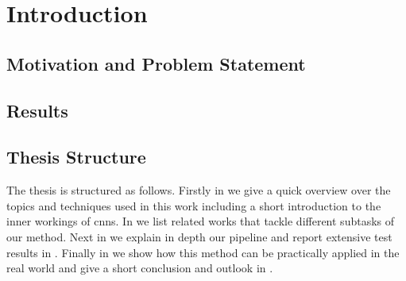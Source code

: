 %
\chapter{Introduction}
\label{sec:intro}

\section{Motivation and Problem Statement}
\label{sec:intro:motivation}

\section{Results}
\label{sec:intro:results}

\section{Thesis Structure}
\label{sec:intro:structure}
The thesis is structured as follows. Firstly in \textbf{} we give a quick overview over the topics and techniques used in this work including a short introduction to the inner workings of \glspl{cnn}. In \textbf{} we list related works that tackle different subtasks of our method. Next in \textbf{} we explain in depth our pipeline and report extensive test results in \textbf{}. Finally in \textbf{} we show how this method can be practically applied in the real world and give a short conclusion and outlook in \textbf{}.
